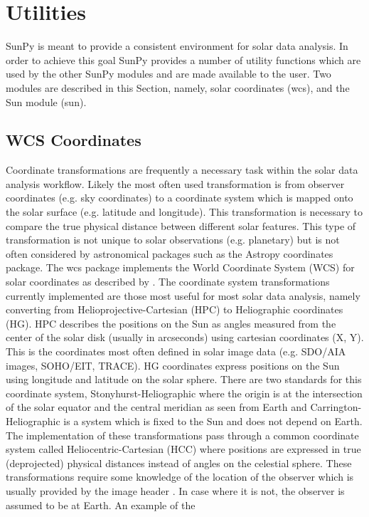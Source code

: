 \section{Utilities}
SunPy is meant to provide a consistent environment for solar data analysis. In 
order to achieve this goal SunPy provides a number of utility functions which 
are used by the other SunPy modules and are made available to the user. Two 
modules are described in this Section, namely, solar coordinates (wcs), and 
the Sun module (sun). 
	
\subsection{WCS Coordinates}
Coordinate transformations are frequently a necessary task within the solar 
data analysis workflow. Likely the most often used transformation is from 
observer coordinates (e.g. sky coordinates) to a coordinate system which is 
mapped onto the solar surface (e.g. latitude and longitude). This 
transformation is necessary to compare the true physical distance between 
different solar features. This type of transformation is not unique
to solar observations (e.g. planetary) but is not often considered by astronomical packages
such as the Astropy 
coordinates package. The wcs package implements the World Coordinate 
System (WCS) for solar coordinates as described by \cite{Thompson2000}. The 
coordinate system transformations currently implemented are those most useful 
for most solar data analysis, namely converting from Helioprojective-Cartesian 
(HPC) to Heliographic coordinates (HG). HPC describes the positions on 
the Sun as angles measured from the center of the solar disk (usually in 
arcseconds) using cartesian coordinates (X, Y). This is the coordinates 
most often defined in solar image data (e.g. SDO/AIA images, SOHO/EIT, TRACE). 
HG coordinates express positions on the Sun using longitude and latitude on 
the solar sphere. There are two standards for this coordinate system, 
Stonyhurst-Heliographic where the origin is at the intersection of the solar 
equator and the central meridian as seen from Earth and 
Carrington-Heliographic is a system which is fixed to the Sun and does not depend on Earth. The 
implementation of these transformations pass through a common coordinate system 
called Heliocentric-Cartesian (HCC) where positions are expressed in true 
(deprojected) physical distances instead of angles on the celestial sphere.
These transformations require some knowledge of the location of the observer 
which is usually provided by the image header . In case where it is 
not, the observer is assumed to be at Earth. An example of the 

